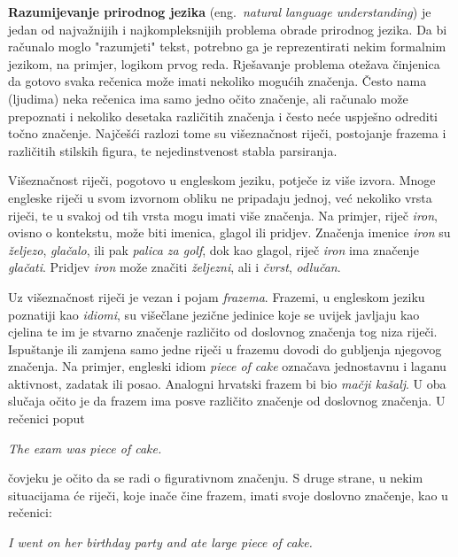 \documentclass[a4paper,twoside,12pt]{memoir} %
\newcommand{\ti}[1]{\textit{#1\/}}
\newcommand{\tb}{\textbf}
\begin{document}
	\tb{Razumijevanje prirodnog jezika}  (eng.~\ti{natural language understanding}) je jedan od najvažnijih i najkompleksnijih problema obrade prirodnog jezika. Da bi računalo moglo "razumjeti" tekst, potrebno ga je reprezentirati nekim formalnim jezikom, na primjer, logikom prvog reda. Rješavanje problema otežava činjenica da gotovo svaka rečenica može imati nekoliko mogućih značenja. Često nama (ljudima) neka rečenica ima samo jedno očito značenje, ali računalo može prepoznati i nekoliko desetaka različitih značenja i često neće uspješno odrediti točno značenje. Najčešći razlozi tome su višeznačnost riječi, postojanje frazema i različitih stilskih figura, te nejedinstvenost stabla parsiranja.

	Višeznačnost riječi, pogotovo u engleskom jeziku, potječe iz više izvora. Mnoge engleske riječi u svom izvornom obliku ne pripadaju jednoj, već nekoliko vrsta riječi, te u svakoj od tih vrsta mogu imati više značenja. Na primjer, riječ \ti{iron}, ovisno o kontekstu, može biti imenica, glagol ili pridjev. Značenja imenice \ti{iron} su \ti{željezo}, \ti{glačalo}, ili pak \ti{palica za golf}, dok kao glagol, riječ \ti{iron} ima značenje \ti{glačati}. Pridjev \ti{iron} može značiti \ti{željezni}, ali i \ti{čvrst}, \ti{odlučan}.

	Uz višeznačnost riječi je vezan i pojam \ti{frazema}. Frazemi, u engleskom jeziku poznatiji kao \ti{idiomi}, su višečlane jezične jedinice koje se uvijek javljaju kao cjelina te im je stvarno značenje različito od doslovnog značenja tog niza riječi. Ispuštanje ili zamjena samo jedne riječi u frazemu dovodi do gubljenja njegovog značenja. Na primjer, engleski idiom \ti{piece of cake} označava jednostavnu i laganu aktivnost, zadatak ili posao. Analogni hrvatski frazem bi bio \ti{mačji kašalj}. U oba slučaja očito je da frazem ima posve različito značenje od doslovnog značenja. U rečenici poput
	\begin{displayquote}
		\ti{The exam was piece of cake.}
	\end{displayquote}
	čovjeku je očito da se radi o figurativnom značenju. S druge strane, u nekim situacijama će riječi, koje inače čine frazem, imati svoje doslovno značenje, kao u rečenici:
	\begin{displayquote}
		\ti{I went on her birthday party and ate large piece of cake.}
	\end{displayquote}
\end{document}

